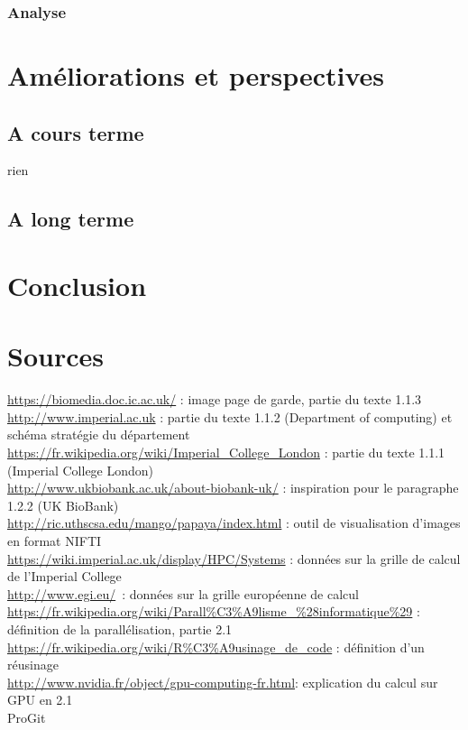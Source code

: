 \documentclass[10pt]{report}
\begin{document}
	\subsection{Analyse}
	
\chapter{Améliorations et perspectives}
	\section{A cours terme}
		rien
	\section{A long terme}
\chapter*{Conclusion} %
\chapter*{Sources}
\noindent
\url{https://biomedia.doc.ic.ac.uk/}  : image page de garde, partie du texte 1.1.3 \\
\url{http://www.imperial.ac.uk} : partie du texte 1.1.2 (Department of computing) et schéma stratégie du département\\
\url{https://fr.wikipedia.org/wiki/Imperial_College_London} : partie du texte 1.1.1 (Imperial College London)\\
\url{http://www.ukbiobank.ac.uk/about-biobank-uk/} : inspiration pour le paragraphe 1.2.2 (UK BioBank)\\
\url{http://ric.uthscsa.edu/mango/papaya/index.html} : outil de visualisation d'images en format NIFTI\\
\url{https://wiki.imperial.ac.uk/display/HPC/Systems} : données sur la grille de calcul de l'Imperial College\\
\url{http://www.egi.eu/} : données sur la grille européenne de calcul
\url{https://fr.wikipedia.org/wiki/Parall\%C3\%A9lisme_\%28informatique\%29} : définition de la parallélisation, partie 2.1\\
\url{https://fr.wikipedia.org/wiki/R\%C3\%A9usinage_de_code} :  définition d'un réusinage \\
\url{http://www.nvidia.fr/object/gpu-computing-fr.html}: explication du calcul sur GPU en 2.1\\
ProGit\\
\end{document}

